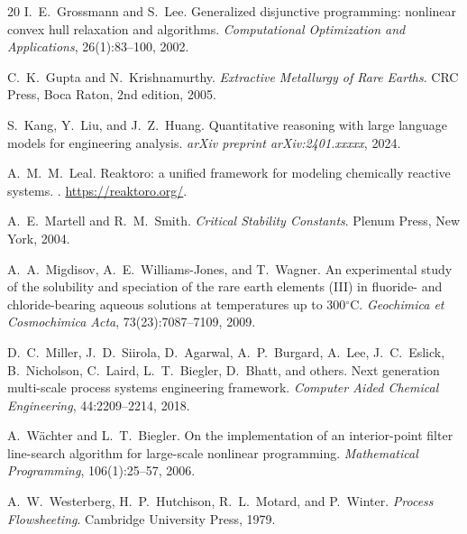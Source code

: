 \documentclass[11pt]{article}
\begin{document}
\begin{thebibliography}{20}
I.~E.~Grossmann and S.~Lee.
\newblock Generalized disjunctive programming: nonlinear convex hull
  relaxation and algorithms.
\newblock \emph{Computational Optimization and Applications},
  26(1):83--100, 2002.

C.~K.~Gupta and N.~Krishnamurthy.
\newblock \emph{Extractive Metallurgy of Rare Earths}.
\newblock CRC Press, Boca Raton, 2nd edition, 2005.

S.~Kang, Y.~Liu, and J.~Z.~Huang.
\newblock Quantitative reasoning with large language models for
  engineering analysis.
\newblock \emph{arXiv preprint arXiv:2401.xxxxx}, 2024.

A.~M.~M.~Leal.
\newblock Reaktoro: a unified framework for modeling chemically
  reactive systems.
.
\newblock \url{https://reaktoro.org/}.

A.~E.~Martell and R.~M.~Smith.
\newblock \emph{Critical Stability Constants}.
\newblock Plenum Press, New York, 2004.

A.~A.~Migdisov, A.~E.~Williams-Jones, and T.~Wagner.
\newblock An experimental study of the solubility and speciation of
  the rare earth elements (III) in fluoride- and chloride-bearing
  aqueous solutions at temperatures up to 300$^\circ${C}.
\newblock \emph{Geochimica et Cosmochimica Acta}, 73(23):7087--7109,
  2009.

D.~C.~Miller, J.~D.~Siirola, D.~Agarwal, A.~P.~Burgard,
  A.~Lee, J.~C.~Eslick, B.~Nicholson, C.~Laird,
  L.~T.~Biegler, D.~Bhatt, and others.
\newblock Next generation multi-scale process systems engineering
  framework.
\newblock \emph{Computer Aided Chemical Engineering}, 44:2209--2214,
  2018.

A.~W{\"a}chter and L.~T.~Biegler.
\newblock On the implementation of an interior-point filter
  line-search algorithm for large-scale nonlinear programming.
\newblock \emph{Mathematical Programming}, 106(1):25--57, 2006.

A.~W.~Westerberg, H.~P.~Hutchison, R.~L.~Motard, and
  P.~Winter.
\newblock \emph{Process Flowsheeting}.
\newblock Cambridge University Press, 1979.


\end{thebibliography}
\end{document}

